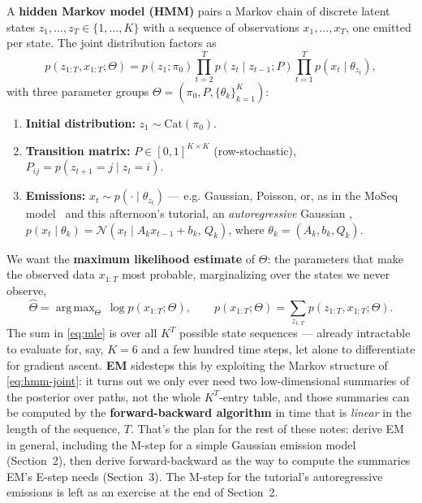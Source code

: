 \documentclass[11pt]{article}
\newcommand{\N}{\mathcal{N}}
\newcommand{\Cat}{\mathrm{Cat}}
\DeclareMathOperator*{\argmax}{arg\,max}
\begin{document}
A \textbf{hidden Markov model (HMM)} pairs a Markov chain of discrete latent
states $z_1, \ldots, z_T \in \{1,\ldots,K\}$ with a sequence of observations
$x_1, \ldots, x_T$, one emitted per state. The joint distribution
factors as
\begin{equation}
p(z_{1:T}, x_{1:T}; \Theta)
= p(z_1; \pi_0) \prod_{t=2}^T p(z_t \mid z_{t-1}; P) \prod_{t=1}^T p(x_t \mid \theta_{z_t}),
\label{eq:hmm-joint}
\end{equation}
with three parameter groups $\Theta = (\pi_0, P, \{\theta_k\}_{k=1}^K)$:
\begin{enumerate}[itemsep=2pt]
  \item \textbf{Initial distribution:} $z_1 \sim \Cat(\pi_0)$.
  \item \textbf{Transition matrix:} $P \in [0,1]^{K\times K}$
    (row-stochastic), $P_{ij} = p(z_{t+1}{=}j \mid z_t{=}i)$.
  \item \textbf{Emissions:} $x_t \sim p(\cdot \mid \theta_{z_t})$ ---
    e.g. Gaussian, Poisson, or, as in the MoSeq model~\citep{wiltschko2015mapping} and this afternoon's tutorial, an
    \emph{autoregressive} Gaussian , $p(x_t \mid \theta_k) =
    \N(x_t \mid A_k x_{t-1} + b_k,\, Q_k)$, where $\theta_k = (A_k, b_k, Q_k)$.
\end{enumerate}
We want the \textbf{maximum likelihood estimate} of $\Theta$: the parameters
that make the observed data $x_{1:T}$ most probable, marginalizing over
the states we never observe,
\begin{equation}
\hat\Theta = \argmax_\Theta \ \log p(x_{1:T}; \Theta),
\qquad
p(x_{1:T}; \Theta) = \sum_{z_{1:T}} p(z_{1:T}, x_{1:T}; \Theta).
\label{eq:mle}
\end{equation}
The sum in \eqref{eq:mle} is over all $K^T$ possible state sequences ---
already intractable to evaluate for, say, $K=6$ and a few hundred time
steps, let alone to differentiate for gradient ascent. \textbf{EM} sidesteps
this by exploiting the Markov structure of \eqref{eq:hmm-joint}: it turns
out we only ever need two low-dimensional summaries of the posterior over
paths, not the whole $K^T$-entry table, and those summaries can be computed
by the \textbf{forward-backward algorithm} \citep{rabiner1986introduction} in time that is \textit{linear} in the length of the sequence, $T$. That's the
plan for the rest of these notes: derive EM in general, including the
M-step for a simple Gaussian emission model (Section~2), then derive
forward-backward as the way to compute the summaries EM's E-step needs
(Section~3). The M-step for the tutorial's autoregressive emissions is left
as an exercise at the end of Section~2.
\end{document}
